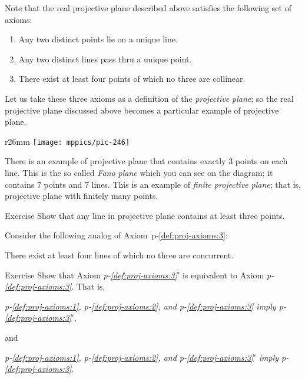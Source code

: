 Note that the real projective plane described above satisfies the following set of axioms:

\begin{framed}

\begin{enumerate}[p-I.]
\item\label{def:proj-axioms:1} Any two distinct points lie on a unique line.
\item\label{def:proj-axioms:2} Any two distinct lines pass thru a unique point.
\item\label{def:proj-axioms:3} There exist at least four points of which no three are collinear.
\end{enumerate}

\end{framed}

Let us take these three axioms as a definition of the \emph{projective plane};
so the real projective plane discussed above becomes a particular example of projective plane.

{

\begin{wrapfigure}{r}{26mm}
\vskip-0mm
\centering
\texttt{[image: mppics/pic-246]}
\end{wrapfigure}

There is an example of projective plane that contains exactly 3 points on each line.
This is the so called \emph{Fano plane} which you can see on the diagram;
it contains $7$ points and $7$ lines.
This is an example of \emph{finite projective plane};
that is, projective plane with finitely many points.

}

\begin{thm}{Exercise}\label{ex:finite-pp}
Show that any line in projective plane contains at least three points.
\end{thm}


Consider the following analog of Axiom~p-\ref{def:proj-axioms:3}:

\begin{framed}
There exist at least four lines of which no three are concurrent.
\end{framed}

\begin{thm}{Exercise}\label{ex:3=3'}
Show that Axiom {}\emph{p-\ref{def:proj-axioms:3}$'$} is equivalent to Axiom {}\emph{p-\ref{def:proj-axioms:3}}.
That is, 
\begin{center}
\emph{p-\ref{def:proj-axioms:1}, p-\ref{def:proj-axioms:2}, and p-\ref{def:proj-axioms:3} imply  p-\ref{def:proj-axioms:3}$'$},
\end{center}
and 
\begin{center}
\emph{p-\ref{def:proj-axioms:1}, p-\ref{def:proj-axioms:2}, and p-\ref{def:proj-axioms:3}$'$ imply p-\ref{def:proj-axioms:3}}.
\end{center}

\end{thm}

